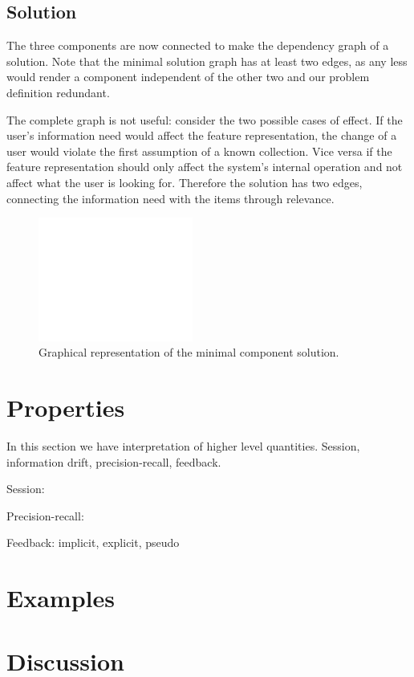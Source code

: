 \documentclass[10pt]{article}
\begin{document}
\subsection{Solution}
The three components are now connected to make the dependency graph of a solution. Note that the minimal solution graph has at least two edges, as any less would render a component independent of the other two and our problem definition redundant.

The complete graph is not useful: consider the two possible cases of effect. If the user's information need would affect the feature representation, the change of a user would violate the first assumption of a known collection. Vice versa if the feature representation should only affect the system's internal operation and not affect what the user is looking for. Therefore the solution has two edges, connecting the information need with the items through relevance.

\begin{figure}[h]
  \includegraphics[width=2in]{empty}
  \caption{Graphical representation of the minimal component solution.}
  \label{fig:connections1}
\end{figure}



\section{Properties}

In this section we have interpretation of higher level quantities. Session, information drift, precision-recall, feedback.

Session:

Precision-recall:

Feedback: implicit, explicit, pseudo


\section{Examples}

\section{Discussion}
\end{document}

